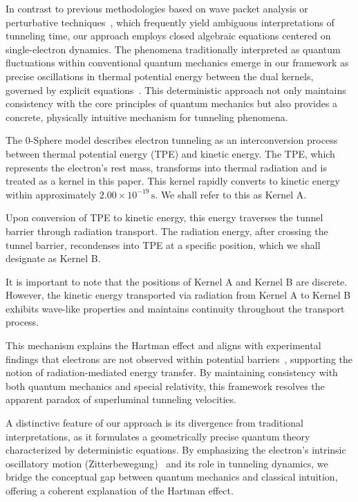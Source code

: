 \documentclass[%
 reprint,
 amsmath,amssymb,
 aps,
]{revtex4-1}
\numberwithin{equation}{section}%
\begin{document}
In contrast to previous methodologies based on wave packet analysis or perturbative techniques~\cite{steinberg1993, buttiker1982}, which frequently yield ambiguous interpretations of tunneling time, our approach employs closed algebraic equations centered on single-electron dynamics. The phenomena traditionally interpreted as quantum fluctuations within conventional quantum mechanics emerge in our framework as precise oscillations in thermal potential energy between the dual kernels, governed by explicit equations~\cite{darwin1928, breit1928}. This deterministic approach not only maintains consistency with the core principles of quantum mechanics but also provides a concrete, physically intuitive mechanism for tunneling phenomena.

The 0-Sphere model describes electron tunneling as an interconversion process between thermal potential energy (TPE) and kinetic energy. The TPE, which represents the electron's rest mass, transforms into thermal radiation and is treated as a kernel in this paper. This kernel rapidly converts to kinetic energy within approximately \( 2.00 \times 10^{-19} \, \mathrm{s} \). We shall refer to this as Kernel A.

Upon conversion of TPE to kinetic energy, this energy traverses the tunnel barrier through radiation transport. The radiation energy, after crossing the tunnel barrier, recondenses into TPE at a specific position, which we shall designate as Kernel B.

It is important to note that the positions of Kernel A and Kernel B are discrete. However, the kinetic energy transported via radiation from Kernel A to Kernel B exhibits wave-like properties and maintains continuity throughout the transport process.

This mechanism explains the Hartman effect and aligns with experimental findings that electrons are not observed within potential barriers~\cite{steinberg1993}, supporting the notion of radiation-mediated energy transfer. By maintaining consistency with both quantum mechanics and special relativity, this framework resolves the apparent paradox of superluminal tunneling velocities.

A distinctive feature of our approach is its divergence from traditional interpretations, as it formulates a geometrically precise quantum theory characterized by deterministic equations. By emphasizing the electron’s intrinsic oscillatory motion (Zitterbewegung)~\cite{breit1928, schrodinger1930} and its role in tunneling dynamics, we bridge the conceptual gap between quantum mechanics and classical intuition, offering a coherent explanation of the Hartman effect.
\end{document}
